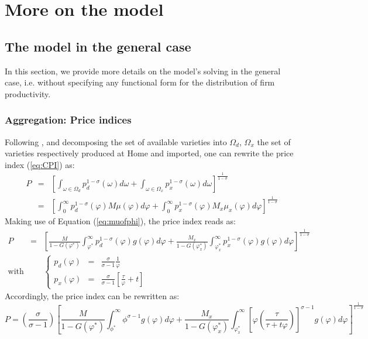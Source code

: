 \documentclass[a4paper,11pt]{article}
\begin{document}
\section{More on the model \label{app:theoretical_model}}

\subsection{The model in the general case}

In this section, we provide more details on the model's solving in the general case, i.e. without specifying any functional form for the distribution of firm productivity.

\subsubsection{Aggregation: Price indices}


Following \cite{melitz}, and decomposing the set of available varieties into $\Omega_d$, $\Omega_x$ the set of varieties respectively produced at Home and imported, one can rewrite the price index (\ref{eq:CPI}) as:
\begin{eqnarray*}
P &=& \left[\int_{\omega \in \Omega_d} p_d^{1-\sigma}(\omega)d\omega + \int_{\omega \in \Omega_x} p_x^{1-\sigma}(\omega)d\omega  \right]^{\frac{1}{1-\sigma}} \\
&=& \left[\int_{0}^\infty p_d^{1-\sigma}(\varphi)M\mu(\varphi)d\varphi + \int_{0}^\infty p_x^{1-\sigma}(\varphi)M_x \mu_x(\varphi)d\varphi  \right]^{\frac{1}{1-\sigma}}
\end{eqnarray*}
Making use of Equation (\ref{eq:muofphi}), the price index reads as:
\begin{eqnarray*}
P &=& \left[\frac{M}{1-G(\varphi^\ast)}\int_{\varphi^\ast}^\infty p_d^{1-\sigma}(\varphi)g(\varphi)d\varphi + \frac{M_x}{1-G(\varphi_x^\ast)}\int_{\varphi^\ast_x}^\infty p_x^{1-\sigma}(\varphi)g(\varphi)d\varphi  \right]^{\frac{1}{1-\sigma}} \\
\text{with}&& \left\{
\begin{array}{lll}
p_d(\varphi)&=& \frac{\sigma}{\sigma-1} \frac{1}{\varphi}\\
p_x(\varphi)&=& \frac{\sigma}{\sigma-1} \left[\frac{\tau}{\varphi} +t\right]
\end{array}
\right.
\end{eqnarray*}
Accordingly, the price index can be rewritten as:
$$P = \left(\frac{\sigma}{\sigma-1}\right)\left[\frac{M}{1-G(\varphi^\ast)}\int_{\phi^\ast}^\infty \phi^{\sigma-1}g(\varphi)d\varphi + \frac{M_x}{1-G(\varphi_x^\ast)}\int_{\varphi^\ast_x}^\infty \left[\varphi \left(\frac{\tau}{\tau+t \varphi}  \right)  \right]^{\sigma-1}g(\varphi)d\varphi  \right]^{\frac{1}{1-\sigma}}$$
\end{document}
